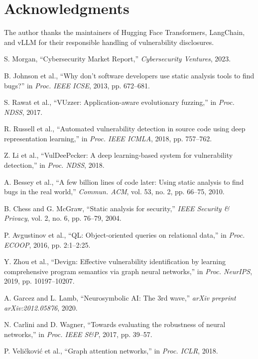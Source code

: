 \documentclass[10pt,journal,compsoc]{IEEEtran}
\begin{document}
\section*{Acknowledgments}
The author thanks the maintainers of Hugging Face Transformers, LangChain, and vLLM for their responsible handling of vulnerability disclosures. 


\begin{thebibliography}{10}

S. Morgan, ``Cybersecurity Market Report,'' \emph{Cybersecurity Ventures}, 2023.

B. Johnson et al., ``Why don't software developers use static analysis tools to find bugs?'' in \emph{Proc. IEEE ICSE}, 2013, pp. 672--681.

S. Rawat et al., ``VUzzer: Application-aware evolutionary fuzzing,'' in \emph{Proc. NDSS}, 2017.

R. Russell et al., ``Automated vulnerability detection in source code using deep representation learning,'' in \emph{Proc. IEEE ICMLA}, 2018, pp. 757--762.

Z. Li et al., ``VulDeePecker: A deep learning-based system for vulnerability detection,'' in \emph{Proc. NDSS}, 2018.

A. Bessey et al., ``A few billion lines of code later: Using static analysis to find bugs in the real world,'' \emph{Commun. ACM}, vol. 53, no. 2, pp. 66--75, 2010.

B. Chess and G. McGraw, ``Static analysis for security,'' \emph{IEEE Security \& Privacy}, vol. 2, no. 6, pp. 76--79, 2004.

P. Avgustinov et al., ``QL: Object-oriented queries on relational data,'' in \emph{Proc. ECOOP}, 2016, pp. 2:1--2:25.

Y. Zhou et al., ``Devign: Effective vulnerability identification by learning comprehensive program semantics via graph neural networks,'' in \emph{Proc. NeurIPS}, 2019, pp. 10197--10207.

A. Garcez and L. Lamb, ``Neurosymbolic AI: The 3rd wave,'' \emph{arXiv preprint arXiv:2012.05876}, 2020.

N. Carlini and D. Wagner, ``Towards evaluating the robustness of neural networks,'' in \emph{Proc. IEEE S\&P}, 2017, pp. 39--57.

P. Veli\v{c}kovi\'{c} et al., ``Graph attention networks,'' in \emph{Proc. ICLR}, 2018.

\end{thebibliography}
\end{document}
